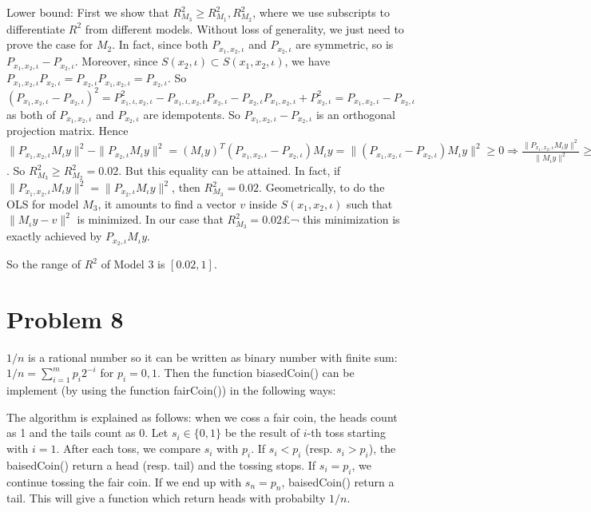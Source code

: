 \documentclass[12pt]{amsart}
\begin{document}
Lower bound: First we show that $R_{M_3}^2\geq R_{M_1}^2,R_{M_2}^2$, where we use subscripts to differentiate $R^2$ from different models. Without loss of generality, we just need to prove the case for $M_2$. In fact, since both $P_{x_1,x_2,\iota}$ and $P_{x_2,\iota}$ are symmetric, so is $P_{x_1,x_2,\iota}-P_{x_2,\iota}$. Moreover, since $S(x_2,\iota)\subset S(x_1,x_2,\iota)$, we have $P_{x_1,x_2,\iota}P_{x_2,\iota}=P_{x_2,\iota}P_{x_1,x_2,\iota}=P_{x_2,\iota}$. So $(P_{x_1,x_2,\iota}-P_{x_2,\iota})^2=
 P_{x_1,\iota,x_2,\iota}^2-P_{x_1,\iota,x_2,\iota}P_{x_2,\iota}
 -P_{x_2,\iota}P_{x_1,x_2,\iota}+P_{x_2,\iota}^2=P_{x_1,x_2,\iota}-P_{x_2,\iota}$
 as both of $P_{x_1,x_2,\iota}$ and $P_{x_2,\iota}$ are idempotents. So $P_{x_1,x_2,\iota}-P_{x_2,\iota}$ is an orthogonal projection matrix. 
  Hence   $\|P_{x_1,x_2,\iota}M_{\iota}y\|^2-
  \|P_{x_2,\iota}M_{\iota}y\|^2=(M_{\iota}y)^T(P_{x_1,x_2,\iota}
 -P_{x_2,\iota})M_{\iota}y=\|(P_{x_1,x_2,\iota}
 -P_{x_2,\iota})M_{\iota}y\|^2\geq0\Rightarrow \frac{\|P_{x_1,x_2,\iota}M_{\iota}y\|^2}{\|M_{\iota}y\|^2}\geq \frac{\|P_{x_2,\iota}M_{\iota}y\|^2}{\|M_{\iota}y\|^2}$. So $R_{M_3}^2\geq R_{M_2}^2=0.02$. But this equality can be attained. In fact, if 
$\|P_{x_1,x_2,\iota}M_{\iota}y\|^2=\|P_{x_2,\iota}M_{\iota}y\|^2$, then 
$R_{M_3}^2=0.02$. Geometrically, to do the OLS for model $M_3$, it amounts to find a
vector $v$ inside $S(x_1,x_2,\iota)$ such that $\|M_{\iota}y-v\|^2$ is minimized. In our case that $R_{M_3}^2=0.02$£¬ this minimization is exactly achieved by $P_{x_2,\iota}M_{\iota}y$.

So the range of $R^2$ of Model 3 is $[0.02, 1]$.


\section{Problem 8}
$1/n$ is a rational number so it can be written as binary number with finite sum: $1/n=\sum_{i=1}^mp_i2^{-i}$ for $p_i=0,1$. Then the function biasedCoin() can be implement (by using the function fairCoin()) in the following ways:


\begin{framed}

\end{framed}
The algorithm is explained as follows: when we coss a fair coin, the heads count as 1 and the tails count as 0. Let $s_i\in\{0,1\}$ be the result of $i$-th toss starting with $i=1$. After each toss, we compare $s_i$ with $p_i$. If $s_i < p_i$ (resp. $s_i > p_i$), the baisedCoin() return a head (resp. tail) and the tossing stops. If $s_i=p_i$, we continue tossing the fair coin. If we end up with $s_n=p_n$, baisedCoin() return a tail. This will give a function which return heads with probabilty $1/n$.
\end{document}
